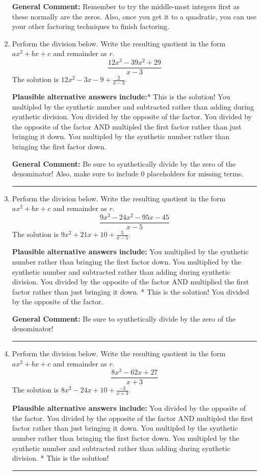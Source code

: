 \documentclass{extbook}[14pt]
\newcommand{\litem}[1]{\item #1

\rule{\textwidth}{0.4pt}}
\begin{document}
\begin{enumerate}
{\textbf{General Comment:} Remember to try the middle-most integers first as these normally are the zeros. Also, once you get it to a quadratic, you can use your other factoring techniques to finish factoring.
}
\litem{
Perform the division below. Write the resulting quotient in the form $ax^2+bx+c$ and remainder as $r$.
\[ \frac{12x^{3} -39 x^{2} + 29}{x -3} \]The solution is \( 12x^{2} -3 x -9 + \frac{2}{x -3} \).\begin{enumerate}[label=\Alph*.]
\textbf{Plausible alternative answers include:}* This is the solution!
 You multipled by the synthetic number and subtracted rather than adding during synthetic division.
 You divided by the opposite of the factor.
 You divided by the opposite of the factor AND multipled the first factor rather than just bringing it down.
 You multipled by the synthetic number rather than bringing the first factor down.
\end{enumerate}

\textbf{General Comment:} Be sure to synthetically divide by the zero of the denominator! Also, make sure to include 0 placeholders for missing terms.
}
\litem{
Perform the division below. Write the resulting quotient in the form $ax^2+bx+c$ and remainder as $r$.
\[ \frac{9x^{3} -24 x^{2} -95 x -45}{x -5} \]The solution is \( 9x^{2} +21 x + 10 + \frac{5}{x -5} \).\begin{enumerate}[label=\Alph*.]
\textbf{Plausible alternative answers include:} You multiplied by the synthetic number rather than bringing the first factor down.
 You multiplied by the synthetic number and subtracted rather than adding during synthetic division.
 You divided by the opposite of the factor AND multiplied the first factor rather than just bringing it down.
* This is the solution!
 You divided by the opposite of the factor.
\end{enumerate}

\textbf{General Comment:} Be sure to synthetically divide by the zero of the denominator!
}
\litem{
Perform the division below. Write the resulting quotient in the form $ax^2+bx+c$ and remainder as $r$.
\[ \frac{8x^{3} -62 x + 27}{x + 3} \]The solution is \( 8x^{2} -24 x + 10 + \frac{-3}{x + 3} \).\begin{enumerate}[label=\Alph*.]
\textbf{Plausible alternative answers include:} You divided by the opposite of the factor.
 You divided by the opposite of the factor AND multipled the first factor rather than just bringing it down.
 You multipled by the synthetic number rather than bringing the first factor down.
 You multipled by the synthetic number and subtracted rather than adding during synthetic division.
* This is the solution!
\end{enumerate}

}
\end{enumerate}
\end{document}
